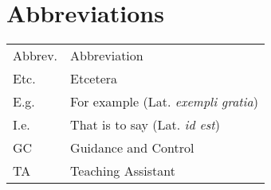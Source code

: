 \chapter{Abbreviations}
\begin{center}
\begin{tabular}{|l|l|}
\hline
Abbrev.   &  Abbreviation \\
Etc.   &  Etcetera \\
E.g. & For example (Lat. \emph{exempli gratia})\\
I.e. & That is to say (Lat. \emph{id est})\\
GC & Guidance and Control \\
TA & Teaching Assistant \\
\hline
\end{tabular}
\end{center}